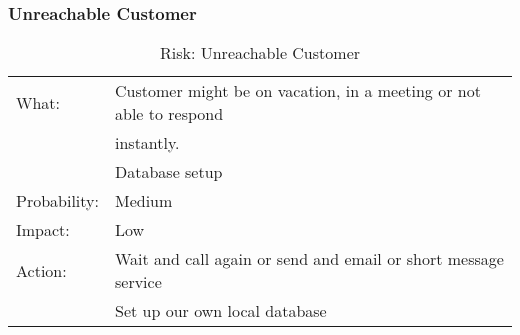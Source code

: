 \subsubsection{Unreachable Customer}
\begin{table}[H]
\begin{tabular}{| l | l |}
	\hline
	What: & Customer might be on vacation, in a meeting or not able to respond\\
	& instantly.\\
	& Database setup\\ %
	\hline
	Probability: & Medium \\
	\hline
	Impact: & Low \\
	\hline
	Action: & Wait and call again or send and email or short message service\\
	& Set up our own local database\\
	\hline
\end{tabular}
\caption{Risk: Unreachable Customer}
\end{table}
